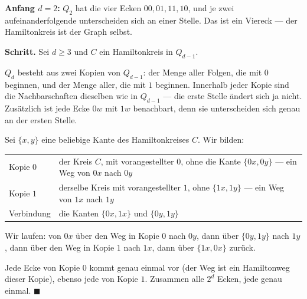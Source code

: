 \begin{merksatz}
\textbf{Anfang $d = 2$:} $Q_2$ hat die vier Ecken $00, 01, 11, 10$, und je zwei aufeinanderfolgende unterscheiden sich an einer Stelle. Das ist ein Viereck --- der Hamiltonkreis ist der Graph selbst.

\textbf{Schritt.} Sei $d \ge 3$ und $C$ ein Hamiltonkreis in $Q_{d-1}$.

$Q_d$ besteht aus zwei Kopien von $Q_{d-1}$: der Menge aller Folgen, die mit $0$ beginnen, und der Menge aller, die mit $1$ beginnen. Innerhalb jeder Kopie sind die Nachbarschaften dieselben wie in $Q_{d-1}$ --- die erste Stelle ändert sich ja nicht. Zusätzlich ist jede Ecke $0w$ mit $1w$ benachbart, denn sie unterscheiden sich genau an der ersten Stelle.

Sei $\{x, y\}$ eine beliebige Kante des Hamiltonkreises $C$. Wir bilden:
\begin{center}
\renewcommand{\arraystretch}{1.45}
\begin{tabular}{@{}P{3.2cm}P{5.4cm}@{}}
\toprule
Kopie $0$ & der Kreis $C$, mit vorangestellter $0$, ohne die Kante $\{0x, 0y\}$ --- ein Weg von $0x$ nach $0y$\\
Kopie $1$ & derselbe Kreis mit vorangestellter $1$, ohne $\{1x, 1y\}$ --- ein Weg von $1x$ nach $1y$\\
Verbindung & die Kanten $\{0x, 1x\}$ und $\{0y, 1y\}$\\
\bottomrule
\end{tabular}
\end{center}

\begin{center}
\end{center}

Wir laufen: von $0x$ über den Weg in Kopie $0$ nach $0y$, dann über $\{0y, 1y\}$ nach $1y$, dann über den Weg in Kopie $1$ nach $1x$, dann über $\{1x, 0x\}$ zurück.

Jede Ecke von Kopie $0$ kommt genau einmal vor (der Weg ist ein Hamiltonweg dieser Kopie), ebenso jede von Kopie $1$. Zusammen alle $2^d$ Ecken, jede genau einmal. $\blacksquare$
\end{merksatz}

